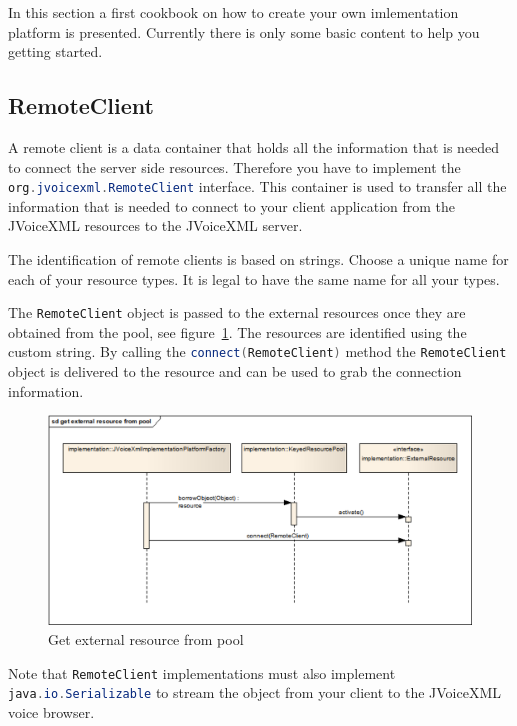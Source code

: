 \documentclass[11pt,a4paper]{article}
\begin{document}
In this section a first cookbook on how to create your own imlementation
platform is presented. Currently there is only some basic content to help you
getting started.


\subsection{RemoteClient}

A remote client is a data container that holds all the information that is
needed to connect the server side resources. Therefore you have to implement
the \lstinline[language=Java]{org.jvoicexml.RemoteClient} interface. This
container is used to transfer all the information that is needed to connect to
your client application from the JVoiceXML resources to the JVoiceXML server.

The identification of remote clients is based on strings. Choose a unique name
for each of your resource types. It is legal to have the same name for all your
types.

The \lstinline[language=Java]{RemoteClient} object is passed to the external
resources once they are obtained from the pool, see
figure~\ref{fig:get-external-resource-from-pool}. The resources are identified
using the custom string. By calling the
\lstinline[language=Java]{connect(RemoteClient)} method the
\lstinline[language=Java]{RemoteClient} object is delivered to the resource and
can be used to grab the connection information.
\begin{figure}[htp]
\begin{center}
  \includegraphics[width=\linewidth]{sd-get-external-resource-from-pool}
  \caption{Get external resource from pool}
  \label{fig:get-external-resource-from-pool}
\end{center}
\end{figure}

Note that \lstinline[language=Java]{RemoteClient} implementations must also
implement \lstinline[language=Java]{java.io.Serializable} to stream the object
from your client to the JVoiceXML voice browser.
\end{document}

